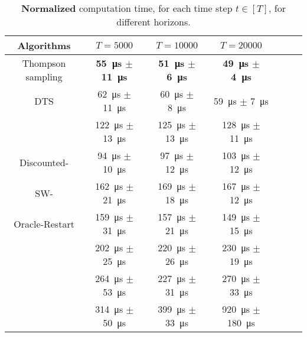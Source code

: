 \begin{table}[ht]
    \centering
    \begin{tabular}{c|cccccc}
    \textbf{Algorithms} & $T=5000$ & $T=10000$ & $T=20000$ \\
        \hline
        Thompson sampling & \textbf{\SI{55}{\micro\second} $\pm$ \SI{11}{\micro\second}} & \textbf{\SI{51}{\micro\second} $\pm$ \SI{6}{\micro\second}} & \textbf{\SI{49}{\micro\second} $\pm$ \SI{4}{\micro\second}} \\
        DTS & \SI{62}{\micro\second} $\pm$ \SI{11}{\micro\second} & \SI{60}{\micro\second} $\pm$ \SI{8}{\micro\second} & \SI{59}{\micro\second} $\pm$ \SI{7}{\micro\second} \\
        \hline
        \klUCB{} & \SI{122}{\micro\second} $\pm$ \SI{13}{\micro\second} & \SI{125}{\micro\second} $\pm$ \SI{13}{\micro\second} & \SI{128}{\micro\second} $\pm$ \SI{11}{\micro\second} \\
        Discounted-\klUCB{} & \SI{94}{\micro\second} $\pm$ \SI{10}{\micro\second} & \SI{97}{\micro\second} $\pm$ \SI{12}{\micro\second} & \SI{103}{\micro\second} $\pm$ \SI{12}{\micro\second} \\
        SW-\klUCB{} & \SI{162}{\micro\second} $\pm$ \SI{21}{\micro\second} & \SI{169}{\micro\second} $\pm$ \SI{18}{\micro\second} & \SI{167}{\micro\second} $\pm$ \SI{12}{\micro\second} \\
        \hline
        Oracle-Restart \klUCB{} & \SI{159}{\micro\second} $\pm$ \SI{31}{\micro\second} & \SI{157}{\micro\second} $\pm$ \SI{21}{\micro\second} & \SI{149}{\micro\second} $\pm$ \SI{15}{\micro\second} \\
        \hline
        \MklUCB{} & \SI{202}{\micro\second} $\pm$ \SI{25}{\micro\second} & \SI{220}{\micro\second} $\pm$ \SI{26}{\micro\second} & \SI{230}{\micro\second} $\pm$ \SI{19}{\micro\second} \\
        \CUSUMklUCB{} & \SI{264}{\micro\second} $\pm$ \SI{53}{\micro\second} & \SI{227}{\micro\second} $\pm$ \SI{31}{\micro\second} & \SI{270}{\micro\second} $\pm$ \SI{33}{\micro\second} \\
        \GLRklUCB{} & \SI{314}{\micro\second} $\pm$ \SI{50}{\micro\second} & \SI{399}{\micro\second} $\pm$ \SI{33}{\micro\second} & \SI{920}{\micro\second} $\pm$ \SI{180}{\micro\second}
    \end{tabular}
    \caption{\textbf{Normalized} computation time, for each time step $t\in[T]$, for different horizons.}
    \label{table:6:TimeCosts}
\end{table}

